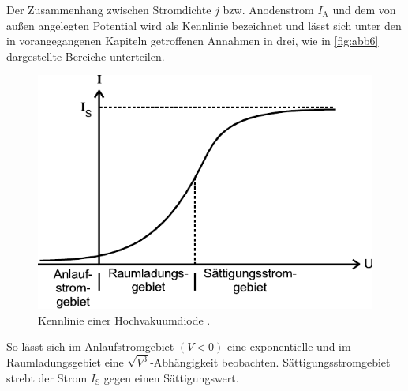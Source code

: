 Der Zusammenhang zwischen Stromdichte $j$ bzw. Anodenstrom $I_\text{A}$
und dem von außen angelegten Potential wird als Kennlinie bezeichnet und lässt sich unter
den in vorangegangenen Kapiteln getroffenen Annahmen in drei, wie in \autoref{fig:abb6}
dargestellte Bereiche unterteilen.

\begin{figure}[H]
    \centering
    \includegraphics{figures/Abb6.pdf}
    \caption{Kennlinie einer Hochvakuumdiode \cite{ap09}.}
    \label{fig:abb6}
\end{figure}

So lässt sich im Anlaufstromgebiet $(V < 0)$ eine exponentielle und
im Raumladungsgebiet eine $\sqrt{V^3}$-Abhängigkeit beobachten.
Sättigungsstromgebiet strebt der Strom $I_\text{S}$ gegen einen
Sättigungswert.




